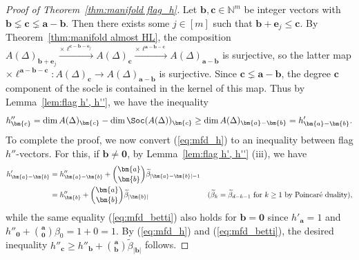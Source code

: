 \begin{proof}[Proof of Theorem~\ref{thm:manifold flag_h}]
Let $\bm{b}, \bm{c} \in \mathbb{N}^m$ be integer vectors with $\bm{b} \lneq \bm{c} \lneq \bm{a}-\bm{b}$.
Then there exists some $j\in[m]$ such that $\bm{b}+\bm{e}_j \leq \bm{c}$.
By Theorem~\ref{thm:manifold almost HL}, the composition $A(\Delta)_{\bm{b}+\bm{e}_j} \overset{\times \bm{\ell}^{\bm{c}-\bm{b}-\bm{e}_j}}{\longrightarrow} A(\Delta)_{\bm{c}} \overset{\times \bm{\ell}^{\bm{a}-\bm{b}-\bm{c}}}{\longrightarrow} A(\Delta)_{\bm{a}-\bm{b}}$ is surjective, so the latter map $\times \bm{\ell}^{\bm{a}-\bm{b}-\bm{c}}:A(\Delta)_{\bm{c}} \rightarrow A(\Delta)_{\bm{a}-\bm{b}}$ is surjective.
Since $\bm{c} \lneq \bm{a}-\bm{b}$, the degree $\bm{c}$ component of the socle is contained in the kernel of this map. 
Thus by Lemma~\ref{lem:flag h', h''}, we have the inequality
\begin{equation}
h''_{\bm{c}}=\dim A(\Delta)_{\bm{c}} - \dim \Soc(A(\Delta))_{\bm{c}} \geq \dim A(\Delta)_{\bm{a}-\bm{b}} = h'_{\bm{a}-\bm{b}}. \label{eq:mfd_h}
\end{equation}
To complete the proof, we now convert (\ref{eq:mfd_h}) to an inequality between flag $h''$-vectors.
For this, if $\bm{b}\neq\bm{0}$, by Lemma~\ref{lem:flag h', h''} (iii), we have 
\begin{align}
h'_{\bm{a}-\bm{b}} &=h''_{\bm{a}-\bm{b}}+\binom{\bm{a}}{\bm{b}}\widetilde{\beta}_{|\bm{a}-\bm{b}|-1} & \notag \\
&=h''_{\bm{b}} + \binom{\bm{a}}{\bm{b}}\widetilde{\beta}_{|\bm{b}|} & (\widetilde{\beta}_{k}=\widetilde{\beta}_{d-k-1} \text{ for } k \geq 1 \text{ by Poincar\'{e} duality}), \label{eq:mfd_betti}
\end{align}
while the same equality (\ref{eq:mfd_betti}) also holds for $\bm{b}=\bm{0}$ since $h'_{\bm{a}}=1$ and $h''_{\bm{0}}+\binom{\bm{a}}{\bm{0}}\beta_{0}=1+0=1$. By (\ref{eq:mfd_h}) and (\ref{eq:mfd_betti}), the desired inequality $h''_{\bm{c}} \geq h''_{\bm{b}}+\binom{\bm{a}}{\bm{b}}\widetilde{\beta}_{|\bm{b}|}$ follows.
\end{proof}

